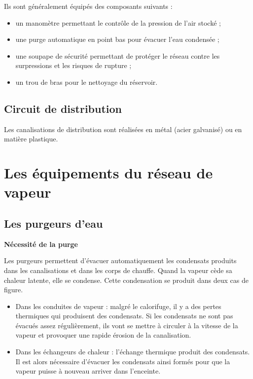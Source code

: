 Ils sont généralement équipés des composants suivants :
\begin{itemize}
\item  un manomètre permettant le contrôle de la pression de l’air stocké ;
\item  une purge automatique en point bas pour évacuer l’eau condensée ;
\item  une soupape de sécurité permettant de protéger le réseau contre les surpressions et les risques de rupture ;
\item  un trou de bras pour le nettoyage du réservoir.

\end{itemize}

\subsection{Circuit de distribution}

Les canalisations de distribution sont réalisées en métal (acier galvanisé) ou en matière plastique.



\section{Les équipements du réseau de vapeur}


\subsection{Les purgeurs d’eau}

\textbf{Nécessité de la purge}


Les purgeurs permettent d’évacuer automatiquement les condensats produits dans les canalisations et dans les corps de chauffe.
Quand la vapeur cède sa chaleur latente, elle se condense. Cette condensation se produit dans deux cas de figure.



\begin{itemize}

\item  Dans les conduites de vapeur : malgré le calorifuge, il y a des pertes thermiques qui produisent des condensats. Si les condensats ne sont pas évacués assez régulièrement, ils vont se mettre à circuler à la vitesse de la vapeur et provoquer une rapide érosion de la canalisation.
\item  Dans les échangeurs de chaleur : l’échange thermique produit des condensats. Il est alors nécessaire d’évacuer les condensats ainsi formés pour que la vapeur puisse à nouveau arriver dans l’enceinte.

\end{itemize}

